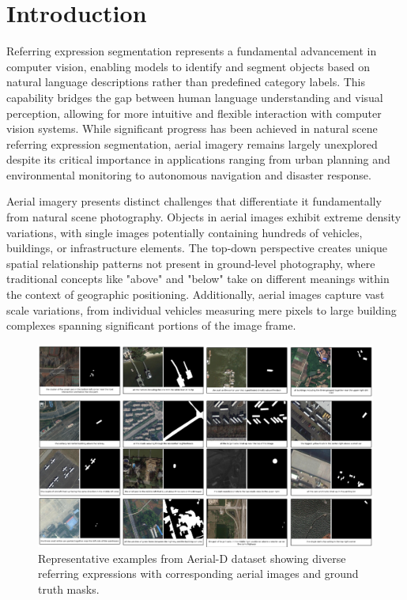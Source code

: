 
\section{Introduction}
\label{sec:intro}

Referring expression segmentation represents a fundamental advancement in computer vision, enabling models to identify and segment objects based on natural language descriptions rather than predefined category labels. This capability bridges the gap between human language understanding and visual perception, allowing for more intuitive and flexible interaction with computer vision systems. While significant progress has been achieved in natural scene referring expression segmentation, aerial imagery remains largely unexplored despite its critical importance in applications ranging from urban planning and environmental monitoring to autonomous navigation and disaster response.

Aerial imagery presents distinct challenges that differentiate it fundamentally from natural scene photography. Objects in aerial images exhibit extreme density variations, with single images potentially containing hundreds of vehicles, buildings, or infrastructure elements. The top-down perspective creates unique spatial relationship patterns not present in ground-level photography, where traditional concepts like "above" and "below" take on different meanings within the context of geographic positioning. Additionally, aerial images capture vast scale variations, from individual vehicles measuring mere pixels to large building complexes spanning significant portions of the image frame.

\begin{figure}[H]
\centering
\includegraphics[width=\columnwidth]{./images/dataset.png}
\caption{Representative examples from Aerial-D dataset showing diverse referring expressions with corresponding aerial images and ground truth masks.}
\label{fig:dataset_examples}
\end{figure}

